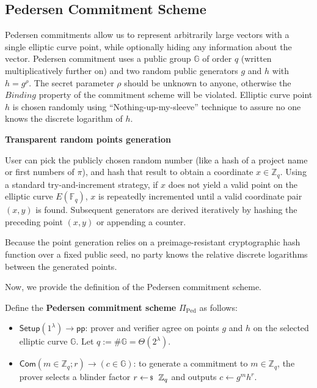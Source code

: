 \documentclass[../../book]{subfiles}
\begin{document}
\subsection{Pedersen Commitment Scheme}

Pedersen commitments \cite{pedersen1991} allow us to represent arbitrarily large vectors with a single elliptic curve point, while optionally hiding any information about the vector. Pedersen commitment uses a public group $\mathbb{G}$ of order $q$ (written multiplicatively further on) and two random public generators $g$ and $h$ with $h=g^{\rho}$. The secret parameter $\rho$ should be unknown to anyone, otherwise the $\textit{Binding}$ property of the commitment scheme will be violated.
Elliptic curve point $h$ is chosen randomly using ``Nothing-up-my-sleeve'' technique to assure no one knows the discrete logarithm of $h$.

\begin{remark}
    \textbf{Transparent random points generation}

    User can pick the publicly chosen random number (like a hash of a project name or first numbers of $\pi$), and hash that result to obtain a coordinate $x \in \mathbb{Z}_q$. Using a standard try-and-increment strategy, if $x$ does not yield a valid point on the elliptic curve $E(\mathbb{F}_q)$, $x$ is repeatedly incremented until a valid coordinate pair $(x, y)$ is found. Subsequent generators are derived iteratively by hashing the preceding point $(x, y)$ or appending a counter.

    Because the point generation relies on a preimage-resistant cryptographic hash function over a fixed public seed, no party knows the relative discrete logarithms between the generated points.
\end{remark}

Now, we provide the definition of the Pedersen commitment scheme.

\begin{definition}
    Define the \textbf{Pedersen commitment scheme} $\Pi_{\text{Ped}}$ as follows:
    \begin{itemize}
        \item $\mathsf{Setup}(1^{\lambda}) \to \mathsf{pp}$: prover and verifier agree on points $g$ and $h$ on the selected elliptic curve $\mathbb{G}$.
        Let $q:=\#\mathbb{G}=\Theta(2^{\lambda})$.
        \item $\mathsf{Com}(m \in \mathbb{Z}_q; r) \to (c \in \mathbb{G})$: to generate a commitment to $m \in \mathbb{Z}_q$, the prover selects a blinder factor $r \leftarrowS \mathbb{Z}_q$ and outputs $c \gets g^m h^r$.
    \end{itemize}
\end{definition}
\end{document}
